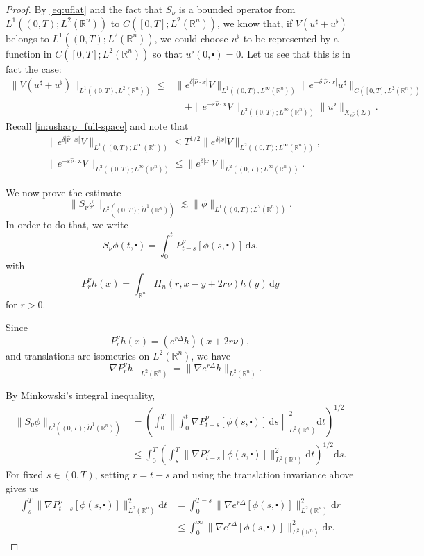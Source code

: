 \documentclass[10pt,a4paper]{amsart}
\newcommand{\R}{\mathbb{R}}
\newcommand{\dd}{\mathrm{d}}
\newcommand{\x}{\mathrm{x}}
\begin{document}
\begin{proof}
By \eqref{eq:uflat} and the fact that $S_\nu$ is a 
bounded operator from $L^1((0, T); L^2(\R^n))$ to 
$C([0, T]; L^2(\R^n))$, we know that, if $V(u^\sharp + u^\flat)$ belongs to 
$L^1((0, T); L^2(\R^n))$, we could choose
$u^\flat$ to be represented by a function in $C([0, T]; L^2(\R^n))$ so that
$u^\flat(0,\centerdot) = 0$.
Let us see that this is in fact the case:
\begin{align*}
\| V(u^\sharp + u^\flat) \|_{L^1((0,T); L^2(\R^n))} \leq & \| e^{\delta |\hat \nu \cdot x|} V \|_{L^1((0,T); L^\infty(\R^n))} \| e^{-\delta |\hat \nu \cdot x|} u^\sharp \|_{C([0, T]; L^2(\R^n))}\\
& \quad + \| e^{- \varepsilon \hat{\nu} \cdot \x} V \|_{L^2((0,T); L^\infty(\R^n))} \| u^\flat \|_{X_{\varepsilon \hat \nu} (\Sigma)}.
\end{align*}
Recall \eqref{in:usharp_full-space} and note that
\begin{align*}
& \| e^{\delta |\hat \nu \cdot x|} V \|_{L^1((0,T); L^\infty(\R^n))} \leq T^{1/2} \| e^{\delta |x|} V \|_{L^2((0,T); L^\infty(\R^n))}, \\
& \| e^{- \varepsilon \hat{\nu} \cdot \x} V \|_{L^2((0,T); L^\infty(\R^n))} \leq \| e^{\delta |x|} V \|_{L^2((0,T); L^\infty(\R^n))}.
\end{align*}

We now prove the estimate
\[
    \|S_\nu\phi\|_{L^2((0,T);\dot H^1(\mathbb R^n))}
    \lesssim
    \|\phi\|_{L^1((0,T);L^2(\mathbb R^n))}.
\]
In order to do that, we write
\[
    S_\nu\phi(t, \centerdot)
    =
    \int_0^t P_{t-s}^\nu[\phi(s, \centerdot)]\, \dd s.
\]
with
\[
    P_r^\nu h(x)
    =
    \int_{\mathbb R^n}
    H_n(r,x-y+2r\nu)h(y)\,\dd y
\]
for $r>0$.

Since
\[
    P_r^\nu h(x)
    =
    (e^{r\Delta}h)(x+2r\nu),
\]
and translations are isometries on $L^2(\mathbb R^n)$, we have
\[
    \|\nabla P_r^\nu h\|_{L^2(\mathbb R^n)}
    =
    \|\nabla e^{r\Delta}h\|_{L^2(\mathbb R^n)}.
\]

By Minkowski's integral inequality,
\begin{align*}
    \|S_\nu\phi\|_{L^2((0,T);\dot H^1(\mathbb R^n))}
    &=
    \left(
        \int_0^T
        \left\|
            \int_0^t
            \nabla P_{t-s}^\nu[\phi(s, \centerdot)]\, \dd s
        \right\|_{L^2(\mathbb R^n)}^2
        \dd t
    \right)^{1/2}
    \\
    &\le
    \int_0^T
    \left(
        \int_s^T
        \|\nabla P_{t-s}^\nu[\phi(s, \centerdot)]\|_{L^2(\mathbb R^n)}^2
        \dd t
    \right)^{1/2}
    \dd s.
\end{align*}
For fixed $s\in(0,T)$, setting $r=t-s$ and using the
translation invariance above gives us
\begin{align*}
    \int_s^T
    \|\nabla P_{t-s}^\nu[\phi(s, \centerdot)]\|_{L^2(\mathbb R^n)}^2
    \dd t
    &=
    \int_0^{T-s}
    \|\nabla e^{r\Delta}[\phi(s, \centerdot)]\|_{L^2(\mathbb R^n)}^2
    \dd r
    \\
    &\le
    \int_0^\infty
    \|\nabla e^{r\Delta}[\phi(s, \centerdot)]\|_{L^2(\mathbb R^n)}^2
    \dd r.
\end{align*}


\end{proof}
\end{document}
